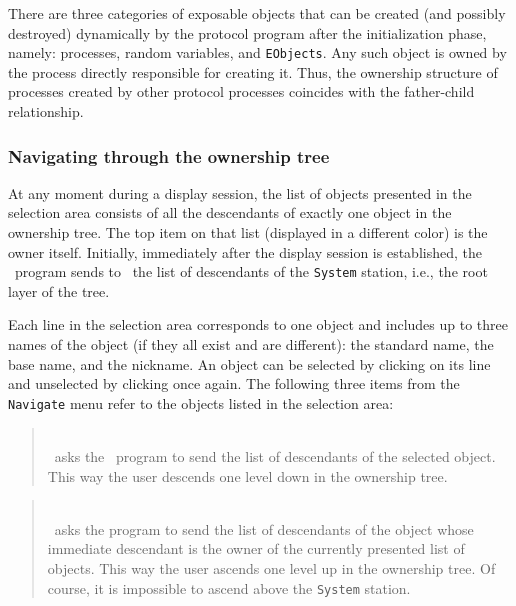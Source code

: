 There are three categories of exposable objects that can be created (and
possibly destroyed) dynamically
by the protocol program after the initialization phase, namely:
processes, random variables, and {\tt EObjects}.
Any such object is owned by the process directly responsible for creating
it.
Thus, the ownership structure of processes created by other protocol
processes coincides with the father-child relationship.

\subsubsection{Navigating through the ownership tree}
\label{rm_ds_om_na}

At any moment during a display session, the list of objects presented in
the selection area consists of all the descendants of exactly
one object in the ownership tree.
The top item on that list (displayed in a different color) is the owner
itself.
Initially, immediately after the display session is established,
the \smurph\ program sends to \dsd\ the list of descendants of the
{\tt System} station, i.e., the root layer of the tree.

Each line in the selection area corresponds to one object and includes
up to three names of the object (if they all exist and are different):
the standard name, the base name, and the nickname.
An object can be selected by clicking on its line and unselected by clicking
once again.
The following three items from the {\tt Navigate} menu refer to the
objects listed in the selection area:
\medskip

\begin{quote}
\noindent{}\\ \hspace{0in}
\dsd\ asks the \smurph\ program to send the list of descendants of the
selected object.
This way the user descends one level down in the ownership tree.
\end{quote}

\begin{quote}
\noindent{}\\ \hspace{0in}
\dsd\ asks the program to send the list of descendants of the object whose
immediate descendant is the owner of the currently presented list of objects.
This way the user ascends one level up in the ownership tree.
Of course, it is impossible to ascend above the {\tt System} station.
\end{quote}

